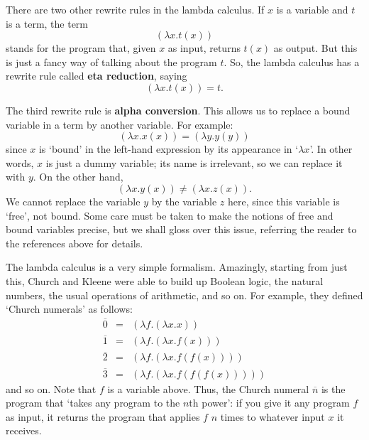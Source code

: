 \documentclass[12pt,twoside,openright]{report}
\begin{document}
There are two other rewrite rules in the lambda calculus.  If $x$ is a variable and $t$ is a term, the term
\[    (\lambda x . t(x)) \]
stands for the program that, given $x$ as input, returns $t(x)$ as output.  But this is just a fancy way of talking about the program
$t$.  So, the lambda calculus has a rewrite rule called {\bf eta reduction}, saying
\[        (\lambda x . t(x)) = t. \]

The third rewrite rule is {\bf alpha conversion}.  This allows us to replace a bound variable in a term by another variable. For example:
\[        (\lambda x . x(x)) = (\lambda y . y(y))  \]
since $x$ is `bound' in the left-hand expression by its appearance in `$\lambda x$'.   In other words, $x$ is just a dummy variable;
its name is irrelevant, so we can replace it with $y$.  On the other hand,
\[        (\lambda x . y(x)) \ne (\lambda x . z(x)).  \]
We cannot replace the variable $y$ by the variable $z$ here, since this variable is `free', not bound.  Some care must be taken to make the notions of free and bound variables precise, but we shall gloss over this issue, referring the reader to the references above for details.

The lambda calculus is a very simple formalism.  Amazingly, starting from just this, Church and Kleene were able to build up Boolean logic, the natural numbers, the usual operations of arithmetic, and so on. For example, they defined `Church numerals' as follows:
\[  \begin{array}{ccl}
       \overline{0} &=& (\lambda f . (\lambda x . x))          \\
       \overline{1} &=& (\lambda f . (\lambda x . f(x)))   \\
       \overline{2} &=& (\lambda f . (\lambda x . f(f(x))))   \\
       \overline{3} &=& (\lambda f . (\lambda x . f(f(f(x)))))
\end{array}   \]
and so on.  Note that $f$ is a variable above.  Thus, the Church numeral $\overline{n}$ is the program that `takes any program to the
$n$th power': if you give it any program $f$ as input, it returns the program that applies $f$ $n$ times to whatever input $x$ it receives.
\end{document}
